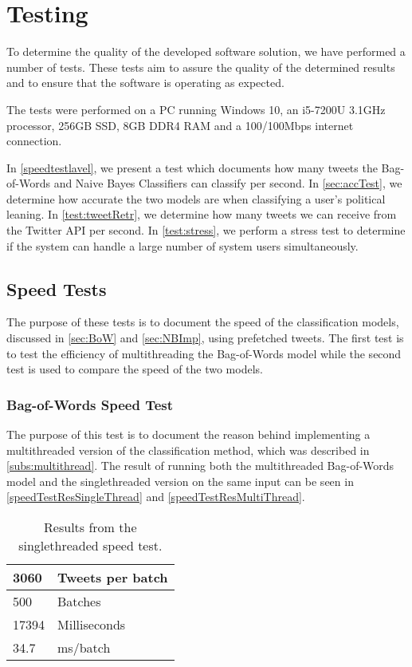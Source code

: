 \chapter{Testing}\label{cha:testing}
To determine the quality of the developed software solution, we have
performed a number of tests. These tests aim to assure the quality of the
determined results and to ensure that the software is operating as
expected.\nl

The tests were performed on a PC running Windows 10, an i5-7200U
3.1GHz processor, 256GB SSD, 8GB DDR4 RAM and a 100/100Mbps internet
connection.\nl

In \autoref{speedtestlavel}, we present a test which documents how many tweets
the Bag-of-Words and Naive Bayes Classifiers can classify per second. In
\autoref{sec:accTest}, we determine how accurate the two models are when
classifying a user's political leaning. In \autoref{test:tweetRetr}, we
determine how many tweets we can receive from the Twitter API per second. In
\autoref{test:stress}, we perform a stress test to determine if the system can
handle a large number of system users simultaneously.  

\section{Speed Tests}\label{speedtestlavel}
The purpose of these tests is to document the speed of the
classification models, discussed in \autoref{sec:BoW} and
\autoref{sec:NBImp}, using prefetched tweets. The first test is to test the
efficiency of multithreading the Bag-of-Words model while the second test is
used to compare the speed of the two models.

\subsection{Bag-of-Words Speed Test}\label{test:multithread}
The purpose of this test is to document the reason behind implementing a
multithreaded version of the classification method, which was described in
\autoref{subs:multithread}. 
The result of running both the multithreaded Bag-of-Words model and the
singlethreaded version on the same input can be seen in
\autoref{speedTestResSingleThread} and \autoref{speedTestResMultiThread}.

\begin{table}[H]\centering
\begin{tabular}{|l|l|}
\hline
3060	&	Tweets per batch 	\\\hline
500		&	Batches				\\\hline
17394	&	Milliseconds		\\\hline
34.7	&	ms/batch 			\\\hline
\end{tabular}
\caption{Results from the singlethreaded speed test.}
\label{speedTestResSingleThread}
\end{table}

